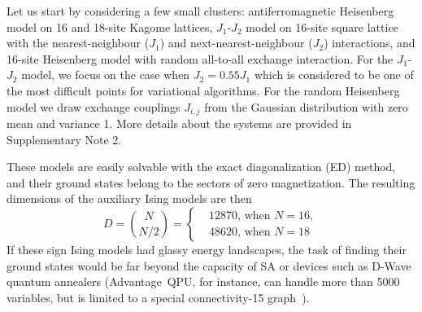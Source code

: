 
Let us start by considering a few small clusters: antiferromagnetic Heisenberg model on 16 and 18-site Kagome lattices, $J_1$-$J_2$ model on 16-site square lattice with the nearest-neighbour ($J_1$) and next-nearest-neighbour ($J_2$) interactions, and 16-site Heisenberg model with random all-to-all exchange interaction. For the $J_1$-$J_2$ model, we focus on the case when $J_2 = 0.55 J_1$ which is considered to be one of the most difficult points for variational algorithms. For the random Heisenberg model we draw exchange couplings $J_{i,j}$ from the Gaussian distribution with zero mean and variance 1. More details about the systems are provided in Supplementary Note 2.

These models are easily solvable with the exact diagonalization (ED) method, and their ground states belong to the sectors of zero magnetization. The resulting dimensions of the auxiliary Ising models are then
\begin{equation*}
    D = \binom{N}{N/2} 
      = \left\{
      \begin{aligned}
         &12870\mbox{, when }N=16, \\
         &48620\mbox{, when }N=18
      \end{aligned}
      \right.
\end{equation*}
If these sign Ising models had glassy energy landscapes, the task of finding their ground states would be far beyond the capacity of SA or devices such as D-Wave quantum annealers (Advantage\texttrademark\ QPU, for instance, can handle more than 5000 variables, but is limited to a special connectivity-15 graph~\cite{boothby2020next}).


